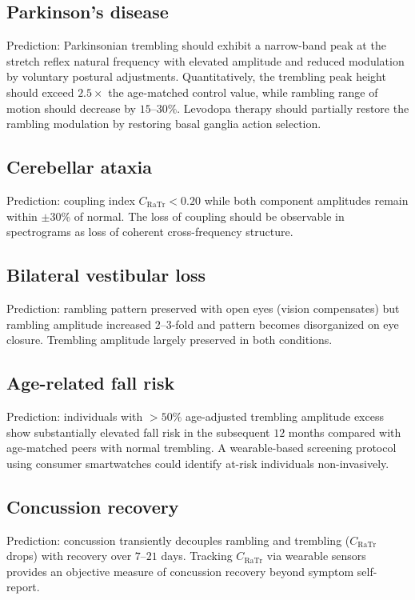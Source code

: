 \documentclass[11pt,twocolumn,a4paper]{article}
\theoremstyle{definition}
\theoremstyle{remark}
\newcommand{\Ra}{\mathrm{Ra}}
\newcommand{\Tr}{\mathrm{Tr}}
\begin{document}
\subsection{Parkinson's disease}

Prediction: Parkinsonian trembling should exhibit a narrow-band
peak at the stretch reflex natural frequency with elevated
amplitude and reduced modulation by voluntary postural adjustments.
Quantitatively, the trembling peak height should exceed
$2.5 \times$ the age-matched control value, while rambling range
of motion should decrease by $15$--$30\%$. Levodopa therapy should
partially restore the rambling modulation by restoring basal
ganglia action selection.

\subsection{Cerebellar ataxia}

Prediction: coupling index $C_{\Ra\Tr} < 0.20$ while both
component amplitudes remain within $\pm 30\%$ of normal. The
loss of coupling should be observable in spectrograms as loss of
coherent cross-frequency structure.

\subsection{Bilateral vestibular loss}

Prediction: rambling pattern preserved with open eyes (vision
compensates) but rambling amplitude increased $2$--$3$-fold and
pattern becomes disorganized on eye closure. Trembling amplitude
largely preserved in both conditions.

\subsection{Age-related fall risk}

Prediction: individuals with $> 50\%$ age-adjusted trembling
amplitude excess show substantially elevated fall risk in the
subsequent $12$ months compared with age-matched peers with
normal trembling. A wearable-based screening protocol using
consumer smartwatches could identify at-risk individuals
non-invasively.

\subsection{Concussion recovery}

Prediction: concussion transiently decouples rambling and
trembling ($C_{\Ra\Tr}$ drops) with recovery over $7$--$21$ days.
Tracking $C_{\Ra\Tr}$ via wearable sensors provides an objective
measure of concussion recovery beyond symptom self-report.
\end{document}
